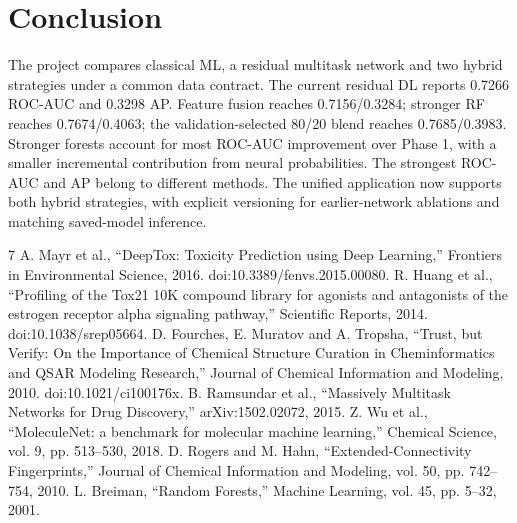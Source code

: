 \documentclass[conference]{IEEEtran}
\begin{document}
\section{Conclusion}
The project compares classical ML, a residual multitask network and two hybrid strategies under a common data contract. The current residual DL reports 0.7266 ROC-AUC and 0.3298 AP. Feature fusion reaches 0.7156/0.3284; stronger RF reaches 0.7674/0.4063; the validation-selected 80/20 blend reaches 0.7685/0.3983. Stronger forests account for most ROC-AUC improvement over Phase 1, with a smaller incremental contribution from neural probabilities. The strongest ROC-AUC and AP belong to different methods. The unified application now supports both hybrid strategies, with explicit versioning for earlier-network ablations and matching saved-model inference.

\begin{thebibliography}{7}
 A. Mayr et al., ``DeepTox: Toxicity Prediction using Deep Learning,'' Frontiers in Environmental Science, 2016. doi:10.3389/fenvs.2015.00080.
 R. Huang et al., ``Profiling of the Tox21 10K compound library for agonists and antagonists of the estrogen receptor alpha signaling pathway,'' Scientific Reports, 2014. doi:10.1038/srep05664.
 D. Fourches, E. Muratov and A. Tropsha, ``Trust, but Verify: On the Importance of Chemical Structure Curation in Cheminformatics and QSAR Modeling Research,'' Journal of Chemical Information and Modeling, 2010. doi:10.1021/ci100176x.
 B. Ramsundar et al., ``Massively Multitask Networks for Drug Discovery,'' arXiv:1502.02072, 2015.
 Z. Wu et al., ``MoleculeNet: a benchmark for molecular machine learning,'' Chemical Science, vol. 9, pp. 513--530, 2018.
 D. Rogers and M. Hahn, ``Extended-Connectivity Fingerprints,'' Journal of Chemical Information and Modeling, vol. 50, pp. 742--754, 2010.
 L. Breiman, ``Random Forests,'' Machine Learning, vol. 45, pp. 5--32, 2001.
\end{thebibliography}
\end{document}
